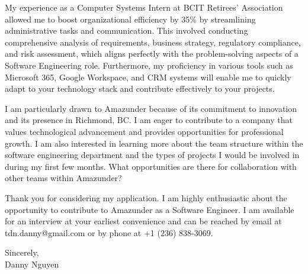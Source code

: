 \documentclass[letterpaper,11pt]{article}
\begin{document}
My experience as a Computer Systems Intern at BCIT Retirees' Association allowed me to boost organizational efficiency by 35\% by streamlining administrative tasks and communication. This involved conducting comprehensive analysis of requirements, business strategy, regulatory compliance, and risk assessment, which aligns perfectly with the problem-solving aspects of a Software Engineering role. Furthermore, my proficiency in various tools such as Microsoft 365, Google Workspace, and CRM systems will enable me to quickly adapt to your technology stack and contribute effectively to your projects.
\vspace{10pt}

I am particularly drawn to Amazunder because of its commitment to innovation and its presence in Richmond, BC. I am eager to contribute to a company that values technological advancement and provides opportunities for professional growth. I am also interested in learning more about the team structure within the software engineering department and the types of projects I would be involved in during my first few months. What opportunities are there for collaboration with other teams within Amazunder?
\vspace{10pt}

Thank you for considering my application. I am highly enthusiastic about the opportunity to contribute to Amazunder as a Software Engineer. I am available for an interview at your earliest convenience and can be reached by email at tdn.danny@gmail.com or by phone at +1 (236) 838-3069.
\vspace{20pt}

Sincerely,\\
\vspace{40pt} %
Danny Nguyen
\end{document}
